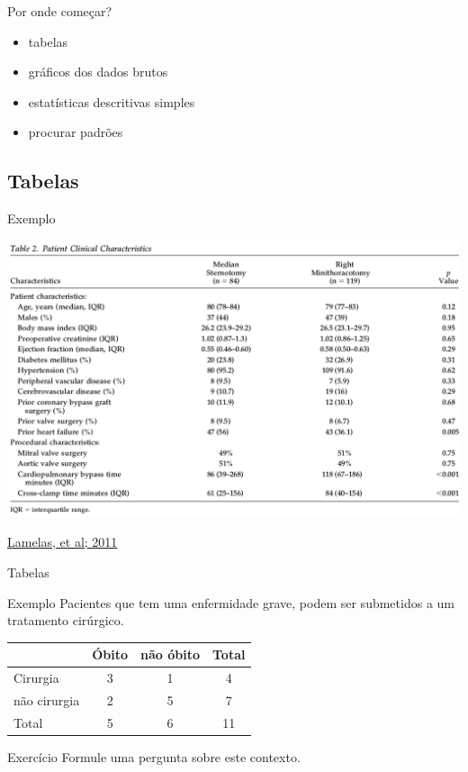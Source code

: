 \documentclass{beamer}
\begin{document}
\begin{frame}{Por onde começar?}
  \begin{itemize}
    \footnotesize
  \item tabelas
    \bigskip
  \item gráficos dos dados brutos
    \bigskip
  \item estatísticas descritivas simples
    \bigskip
  \item procurar padrões
  \end{itemize}
\end{frame}

\subsection{Tabelas}

\begin{frame}
  \begin{exampleblock}{Exemplo}
    \begin{center}
      \includegraphics[width=.9\textwidth]{EDA/eda-tabela}
    \end{center}
  \end{exampleblock}

  \vfill
  \tiny
  \hfill \href{https://doi.org/10.1016/j.athoracsur.2010.09.019}{Lamelas, et al; 2011}
\end{frame}

\begin{frame}{Tabelas}
  \begin{exampleblock}{Exemplo}
    \scriptsize
    Pacientes que tem uma enfermidade grave, podem ser submetidos a um tratamento cirúrgico.

    \bigskip
    \begin{center}
    \begin{tabular}{l|cc|c}
      &Óbito & não óbito & Total\\
      \hline
      Cirurgia & 3 & 1 & 4 \\
      não cirurgia & 2 & 5 & 7\\
      \hline
      Total & 5 & 6 & 11
    \end{tabular}
    \end{center}
  \end{exampleblock}

  \bigskip
  \begin{block}{Exercício}
    Formule uma pergunta sobre este contexto.
  \end{block}
\end{frame}
\end{document}
